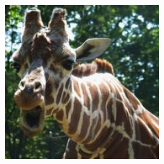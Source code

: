 \documentclass{article}
\begin{document}
\begin{center}
\begin{minipage}{0.142\textwidth}
    \end{minipage}%
    \begin{minipage}{0.142\textwidth}
        \includegraphics[width=\linewidth]{./pic/misclassified_r2_p4_2723.jpg}
    \end{minipage}%


\end{center}
\end{document}
